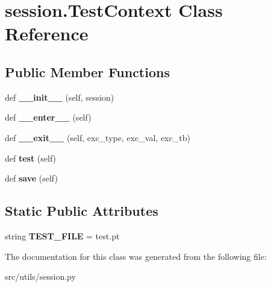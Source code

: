 \hypertarget{classsession_1_1TestContext}{}\section{session.\+Test\+Context Class Reference}
\label{classsession_1_1TestContext}
\subsection*{Public Member Functions}
\begin{DoxyCompactItemize}
\item 
def {\bfseries \+\_\+\+\_\+init\+\_\+\+\_\+} (self, session)\hypertarget{classsession_1_1TestContext_a7faca872e76c21f36b73292333dc7540}{}\label{classsession_1_1TestContext_a7faca872e76c21f36b73292333dc7540}

\item 
def {\bfseries \+\_\+\+\_\+enter\+\_\+\+\_\+} (self)\hypertarget{classsession_1_1TestContext_a74412ef7d5d78497c3a4927cee5c37aa}{}\label{classsession_1_1TestContext_a74412ef7d5d78497c3a4927cee5c37aa}

\item 
def {\bfseries \+\_\+\+\_\+exit\+\_\+\+\_\+} (self, exc\+\_\+type, exc\+\_\+val, exc\+\_\+tb)\hypertarget{classsession_1_1TestContext_a340625a7bc455ce07ebf0c48498146f0}{}\label{classsession_1_1TestContext_a340625a7bc455ce07ebf0c48498146f0}

\item 
def {\bfseries test} (self)\hypertarget{classsession_1_1TestContext_ab865c333747c41a193fc3a8274c09b0e}{}\label{classsession_1_1TestContext_ab865c333747c41a193fc3a8274c09b0e}

\item 
def {\bfseries save} (self)\hypertarget{classsession_1_1TestContext_a54af3636632941e2f2eff991e31fbf6d}{}\label{classsession_1_1TestContext_a54af3636632941e2f2eff991e31fbf6d}

\end{DoxyCompactItemize}
\subsection*{Static Public Attributes}
\begin{DoxyCompactItemize}
\item 
string {\bfseries T\+E\+S\+T\+\_\+\+F\+I\+LE} = \textquotesingle{}test.\+pt\textquotesingle{}\hypertarget{classsession_1_1TestContext_a7b1693b8511928c5167b4f82ff97d0f4}{}\label{classsession_1_1TestContext_a7b1693b8511928c5167b4f82ff97d0f4}

\end{DoxyCompactItemize}


The documentation for this class was generated from the following file\+:\begin{DoxyCompactItemize}
\item 
src/utils/session.\+py\end{DoxyCompactItemize}
